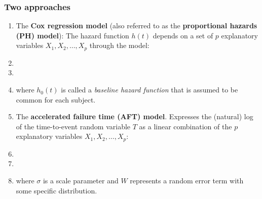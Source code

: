 \begin{frame}
\frametitle{Two approaches}
\begin{enumerate}

\item The \textbf{Cox regression model} (also referred to as the  \textbf{proportional hazards (PH) model}):
The hazard function $h(t)$ depends on a set of $p$ explanatory variables $X_1,X_2, \ldots,X_p$ through the model:
\item[]
\item[]
\item[]
where $h_0(t)$ is called a \textit{baseline hazard function} that is assumed to be common for each subject.



\item The \textbf{accelerated failure time (AFT) model}. Expresses the (natural) log of the time-to-event random variable $T$ as a linear combination of the $p$ explanatory variables $X_1,X_2, \ldots,X_p$:
\item[]
\item[]
\item[]
    where $\sigma$ is a scale parameter and $W$ represents a random error term with some specific distribution.

\end{enumerate}
\end{frame}


